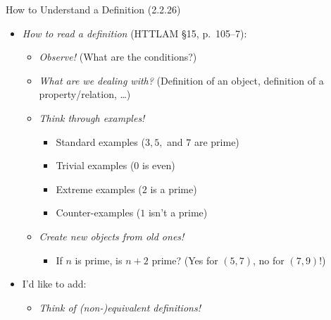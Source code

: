 \begin{frame}{How to Understand a Definition (2.2.26)}

\begin{itemize}

	\item \emph{How to read a definition} (HTTLAM \S15, p.~105--7):
	
		\begin{itemize}
		
			\item \emph{Observe!} (What are the conditions?)
			
			\item \emph{What are we dealing with?} (Definition of an object, definition of a property/relation, \dots)
			
			\item \emph{Think through examples!}
			
				\begin{itemize}
				
					\item Standard examples ($3,5,$ and $7$ are prime)
					
					\item Trivial examples ($0$ is even)
					
					\item Extreme examples ($2$ is a prime)
					
					\item Counter-examples ($1$ isn't a prime)
				
				\end{itemize}
				
			\item \emph{Create new objects from old ones!}
		
			\begin{itemize}
			
				\item If $n$ is prime, is $n+2$ prime? (Yes for $(5,7)$, no for $(7,9)$!)
			
			\end{itemize}
		
		
		\end{itemize}

\item I'd like to add:
		
		\begin{itemize}
		
			\item \emph{Think of (non-)equivalent definitions!}
			

\end{itemize}
\end{itemize}
\end{frame}
